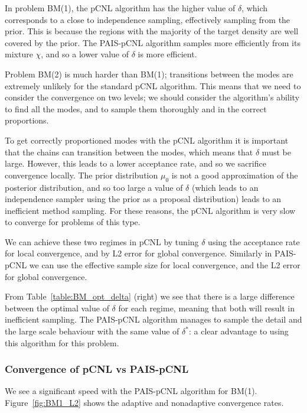 \documentclass[final]{siamltex}
\begin{document}
In problem BM(1), the pCNL algorithm has the
higher value of $\delta$, which corresponds to a close to independence
sampling, effectively sampling from the prior. This is because the
regions with the majority of the target density are well covered by
the prior. The PAIS-pCNL algorithm samples more efficiently from its
mixture $\chi$, and so a lower value of $\delta$ is more efficient.

Problem BM(2) is much harder than BM(1); transitions between the modes
are extremely unlikely for the standard pCNL algorithm. This means that we need to consider the
convergence on two levels; we should consider the algorithm's ability
to find all the modes, and to sample them thoroughly and in the correct proportions.

To get correctly proportioned modes with the pCNL algorithm it is
important that the chains can transition between the modes, which
means that $\delta$ must be large. However, this leads to a lower
acceptance rate, and so we sacrifice convergence locally. The prior distribution $\mu_0$ is
not a good approximation of the posterior distribution, and so too
large a value of $\delta$ (which leads to an independence sampler
using the prior as a proposal distribution) leads to an inefficient
method sampling. For these reasons, the pCNL algorithm is very slow to
converge for problems of this type.

We can achieve these two regimes in pCNL by tuning $\delta$ using the acceptance rate for local convergence, and by L2 error for global convergence. Similarly in PAIS-pCNL we can use the effective sample size for local convergence, and the L2 error for global convergence.

From Table~\ref{table:BM_opt_delta} (right) we see that there is a large difference between the optimal value of $\delta$ for each regime, meaning that both will result in inefficient sampling. The PAIS-pCNL algorithm manages to sample the detail and the large scale behaviour with the same value of $\delta^*$: a clear advantage to using this algorithm for this problem.

\subsubsection{Convergence of pCNL vs PAIS-pCNL}

We see a significant speed with the PAIS-pCNL algorithm for BM(1). Figure~\ref{fig:BM1_L2} shows the adaptive and nonadaptive convergence rates. 
\end{document}
